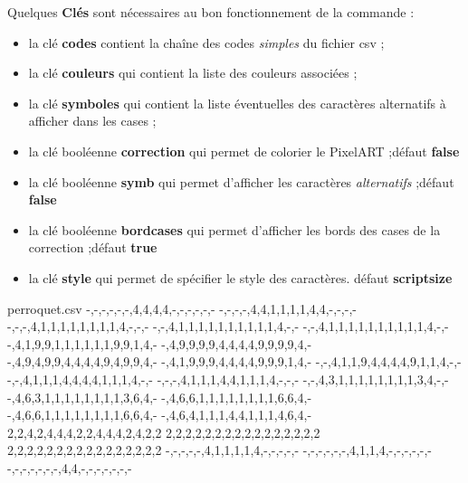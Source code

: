 \documentclass{article}
\newcommand\Cle[1]{{\bfseries\sffamily\textlangle #1\textrangle}}
\begin{document}
\begin{codetex}
\end{codetex}

\begin{codecles}
Quelques \Cle{Clés} sont nécessaires au bon fonctionnement de la commande :

\begin{itemize}
	\item la clé \Cle{codes} contient la \textsf{chaîne} des codes \textit{simples} du  fichier \textsf{csv} ;
	\item la clé \Cle{couleurs} qui contient la \textsf{liste} des couleurs associées ;
	\item la clé \Cle{symboles} qui contient la \textsf{liste éventuelles} des caractères alternatifs à afficher dans les cases ;
	\item la clé booléenne \Cle{correction} qui permet de colorier le PixelART ;\hfill{}défaut \Cle{false}
	\item la clé booléenne \Cle{symb} qui permet d'afficher les caractères \textit{alternatifs} ;\hfill{}défaut \Cle{false}
	\item la clé booléenne \Cle{bordcases} qui permet d'afficher les bords des cases de la correction ;\hfill{}défaut \Cle{true}
	\item la clé \Cle{style} qui permet de spécifier le style des caractères. \hfill{}défaut \Cle{scriptsize}
\end{itemize}
\end{codecles}

\begin{codetex}

\begin{filecontents*}[overwrite]{perroquet.csv}
-,-,-,-,-,-,4,4,4,4,-,-,-,-,-,-
-,-,-,-,4,4,1,1,1,1,4,4,-,-,-,-
-,-,-,4,1,1,1,1,1,1,1,1,4,-,-,-
-,-,4,1,1,1,1,1,1,1,1,1,1,4,-,-
-,-,4,1,1,1,1,1,1,1,1,1,1,4,-,-
-,4,1,9,9,1,1,1,1,1,1,9,9,1,4,-
-,4,9,9,9,9,4,4,4,4,9,9,9,9,4,-
-,4,9,4,9,9,4,4,4,4,9,4,9,9,4,-
-,4,1,9,9,9,4,4,4,4,9,9,9,1,4,-
-,-,4,1,1,9,4,4,4,4,9,1,1,4,-,-
-,-,4,1,1,1,4,4,4,4,1,1,1,4,-,-
-,-,-,4,1,1,1,4,4,1,1,1,4,-,-,-
-,-,4,3,1,1,1,1,1,1,1,1,3,4,-,-
-,4,6,3,1,1,1,1,1,1,1,1,3,6,4,-
-,4,6,6,1,1,1,1,1,1,1,1,6,6,4,-
-,4,6,6,1,1,1,1,1,1,1,1,6,6,4,-
-,4,6,4,1,1,1,4,4,1,1,1,4,6,4,-
2,2,4,2,4,4,4,2,2,4,4,4,2,4,2,2
2,2,2,2,2,2,2,2,2,2,2,2,2,2,2,2
2,2,2,2,2,2,2,2,2,2,2,2,2,2,2,2
-,-,-,-,-,4,1,1,1,1,4,-,-,-,-,-
-,-,-,-,-,-,4,1,1,4,-,-,-,-,-,-
-,-,-,-,-,-,-,4,4,-,-,-,-,-,-,-
\end{filecontents*}


\end{codetex}
\end{document}

